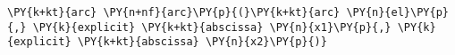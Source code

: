 \begin{Verbatim}[commandchars=\\\{\}]
    \PY{k+kt}{arc} \PY{n+nf}{arc}\PY{p}{(}\PY{k+kt}{arc} \PY{n}{el}\PY{p}{,} \PY{k}{explicit} \PY{k+kt}{abscissa} \PY{n}{x1}\PY{p}{,} \PY{k}{explicit} \PY{k+kt}{abscissa} \PY{n}{x2}\PY{p}{)}
\end{Verbatim}

